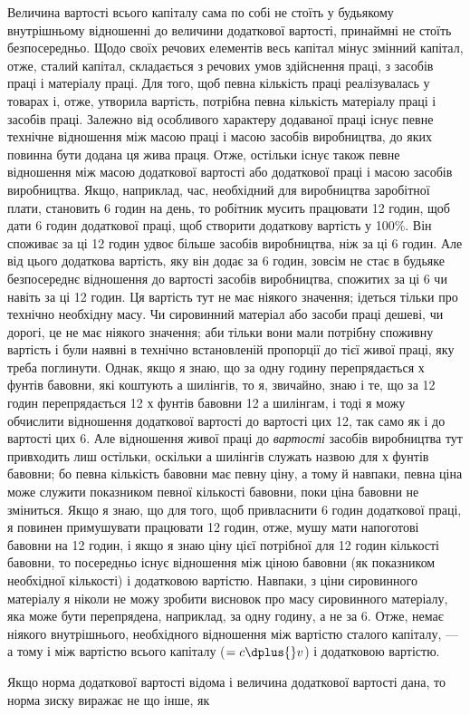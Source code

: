 
Величина вартості всього капіталу сама по собі не стоїть
у будьякому внутрішньому відношенні до величини додаткової
вартості, принаймні не стоїть безпосередньо. Щодо своїх речових
елементів весь капітал мінус змінний капітал, отже, сталий капітал,
складається з речових умов здійснення праці, з засобів праці
і матеріалу праці. Для того, щоб певна кількість праці реалізувалась
у товарах і, отже, утворила вартість, потрібна певна
кількість матеріалу праці і засобів праці. Залежно від особливого
характеру додаваної праці існує певне технічне відношення
між масою праці і масою засобів виробництва, до яких повинна
бути додана ця жива праця. Отже, остільки існує також певне
відношення між масою додаткової вартості або додаткової праці
і масою засобів виробництва. Якщо, наприклад, час, необхідний
для виробництва заробітної плати, становить 6 годин на день,
то робітник мусить працювати 12 годин, щоб дати 6 годин додаткової
праці, щоб створити додаткову вартість у 100\%. Він
споживає за ці 12 годин удвоє більше засобів виробництва, ніж
за ці 6 годин. Але від цього додаткова вартість, яку він додає
за 6 годин, зовсім не стає в будьяке безпосереднє відношення
до вартості засобів виробництва, спожитих за ці 6 чи навіть
за ці 12 годин. Ця вартість тут не має ніякого значення; ідеться
тільки про технічно необхідну масу. Чи сировинний матеріал або
засоби праці дешеві, чи дорогі, це не має ніякого значення;
аби тільки вони мали потрібну споживну вартість і були наявні
в технічно встановленій пропорції до тієї живої праці, яку треба
поглинути. Однак, якщо я знаю, що за одну годину перепрядається
$х$ фунтів бавовни, які коштують $а$ шилінгів, то я, звичайно,
знаю і те, що за 12 годин перепрядається 12 $х$ фунтів
бавовни \deq{} 12 $а$ шилінгам, і тоді я можу обчислити відношення
додаткової вартості до вартості цих 12, так само як і до вартості
цих 6. Але відношення живої праці до \emph{вартості} засобів
виробництва тут привходить лиш остільки, оскільки $а$ шилінгів
служать назвою для $х$ фунтів бавовни; бо певна кількість бавовни
має певну ціну, а тому й навпаки, певна ціна може служити
показником певної кількості бавовни, поки ціна бавовни
не зміниться. Якщо я знаю, що для того, щоб привласнити 6 годин
додаткової праці, я повинен примушувати працювати 12 годин,
отже, мушу мати напоготові бавовни на 12 годин, і якщо я знаю
ціну цієї потрібної для 12 годин кількості бавовни, то посередньо
існує відношення між ціною бавовни (як показником необхідної
кількості) і додатковою вартістю. Навпаки, з ціни сировинного
матеріалу я ніколи не можу зробити висновок про масу сировинного
матеріалу, яка може бути перепрядена, наприклад, за
одну годину, а не за 6. Отже, немає ніякого внутрішнього, необхідного
відношення між вартістю сталого капіталу, — а тому
і між вартістю всього капіталу ($= c \dplus{} v$) і додатковою вартістю.

Якщо норма додаткової вартості відома і величина додаткової
вартості дана, то норма зиску виражає не що інше, як
\parbreak{}  %
